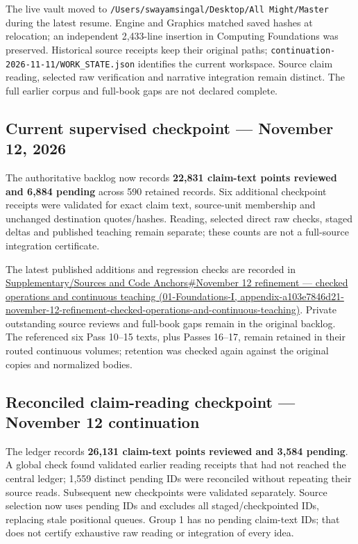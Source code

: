 The live vault moved to \texttt{/Users/swayamsingal/Desktop/All\ Might/Master} during the latest resume. Engine and Graphics matched saved hashes at relocation; an independent 2,433-line insertion in Computing Foundations was preserved. Historical source receipts keep their original paths; \texttt{continuation-2026-11-11/WORK\_STATE.json} identifies the current workspace. Source claim reading, selected raw verification and narrative integration remain distinct. The full earlier corpus and full-book gaps are not declared complete.

\subsection{Current supervised checkpoint --- November 12, 2026}\label{appendix-3b67654799a2-current-supervised-checkpoint-november-12-2026}

The authoritative backlog now records \textbf{22,831 claim-text points reviewed and 6,884 pending} across 590 retained records. Six additional checkpoint receipts were validated for exact claim text, source-unit membership and unchanged destination quotes/hashes. Reading, selected direct raw checks, staged deltas and published teaching remain separate; these counts are not a full-source integration certificate.

The latest published additions and regression checks are recorded in \href{../01-Foundations-I/main.pdf\#nameddest=appendix-a103e7846d21-november-12-refinement-checked-operations-and-continuous-teaching}{Supplementary/Sources and Code Anchors\#November 12 refinement --- checked operations and continuous teaching (01-Foundations-I, appendix-a103e7846d21-november-12-refinement-checked-operations-and-continuous-teaching)}. Private outstanding source reviews and full-book gaps remain in the original backlog. The referenced six Pass 10--15 texts, plus Passes 16--17, remain retained in their routed continuous volumes; retention was checked again against the original copies and normalized bodies.

\subsection{Reconciled claim-reading checkpoint --- November 12 continuation}\label{appendix-3b67654799a2-reconciled-claim-reading-checkpoint-november-12-continuation}

The ledger records \textbf{26,131 claim-text points reviewed and 3,584 pending}. A global check found validated earlier reading receipts that had not reached the central ledger; 1,559 distinct pending IDs were reconciled without repeating their source reads. Subsequent new checkpoints were validated separately. Source selection now uses pending IDs and excludes all staged/checkpointed IDs, replacing stale positional queues. Group 1 has no pending claim-text IDs; that does not certify exhaustive raw reading or integration of every idea.

